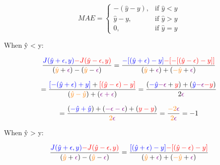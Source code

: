 \documentclass{article}
\begin{document}
\begin{equation*}
MAE = \left\{
\begin{array}{ccc}
-(\hat{y} - y), & \text{if }\hat{y} < y \\
\hat{y} - y, & \text{if }\hat{y} > y \\
0, & \text{if }\hat{y} = y
\end{array} \right.
\end{equation*}

\bigskip\bigskip
When ŷ \textless{} y:

\begin{displaymath}
\frac{\textcolor{blue}{J(\hat{y}+\epsilon, y)}
\textcolor{red}{-J(\hat{y}-\epsilon, y)}}
{(\textcolor{orange}{\hat{y}}+\textcolor{violet}{\epsilon})-(
\textcolor{orange}{\hat{y}}-\textcolor{violet}{\epsilon})}
=\frac{\textcolor{blue}{-[(\hat{y}+\epsilon)-y]}
\textcolor{red}{-[-[(\hat{y}-\epsilon)-y]]}}
{(\textcolor{orange}{\hat{y}}+\textcolor{violet}{\epsilon})+(
\textcolor{orange}{-\hat{y}}+\textcolor{violet}{\epsilon})}
\end{displaymath}

\begin{displaymath}
=\frac{\textcolor{blue}{[-(\hat{y}+\epsilon)+y]}+
\textcolor{red}{[(\hat{y}-\epsilon)-y]}}
{(\textcolor{orange}{\hat{y}-\hat{y}})+(\textcolor{violet}{\epsilon+\epsilon})}
=\frac{(\textcolor{blue}{-\hat{y}}\textcolor{violet}{-\epsilon}+\textcolor{red}{y})+
(\textcolor{blue}{\hat{y}}\textcolor{violet}{-\epsilon}\textcolor{red}{-y})}
{2\textcolor{violet}{\epsilon}}
\end{displaymath}

\begin{displaymath}
=\frac{(\textcolor{blue}{-\hat{y}+\hat{y}})+(\textcolor{violet}{-\epsilon-\epsilon})+
(\textcolor{red}{y-y})}{\textcolor{orange}{2}\textcolor{violet}{\epsilon}}
=\frac{\textcolor{orange}{-2}\textcolor{violet}{\epsilon}}
{\textcolor{orange}{2}\textcolor{violet}{\epsilon}}
= -1
\end{displaymath}

\bigskip\bigskip
When ŷ \textgreater{} y:

\begin{displaymath}
\frac{\textcolor{blue}{J(\hat{y}+\epsilon, y)}
\textcolor{red}{-J(\hat{y}-\epsilon, y)}}
{(\textcolor{orange}{\hat{y}}+\textcolor{violet}{\epsilon})-(
\textcolor{orange}{\hat{y}}-\textcolor{violet}{\epsilon})}
=\frac{\textcolor{blue}{[(\hat{y}+\epsilon)-y]}
\textcolor{red}{-[(\hat{y}-\epsilon)-y]}}
{(\textcolor{orange}{\hat{y}}+\textcolor{violet}{\epsilon})+(
\textcolor{orange}{-\hat{y}}+\textcolor{violet}{\epsilon})}
\end{displaymath}
\end{document}
